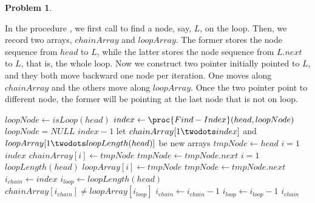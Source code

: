 \documentclass[12pt,a4paper]{report}
\newcommand{\get}{\leftarrow}
\theoremstyle{definition}
\newtheorem{problem}{\textbf{Problem}}
\theoremstyle{definition}
\begin{document}
\begin{problem}
\begin{enumerate}[label=\arabic*.]
\begin{enumerate}[label=\alph*.]
\begin{framed}
In the procedure , we first call  to find a node, say, $L$, on the loop. Then, we record two arrays, $chainArray$ and $loopArray$. The former stores the node sequence from $head$ to $L$, while the latter stores the node sequence from $L.next$ to $L$, that is, the whole loop. Now we construct two pointer initially pointed to $L$, and they both move backward one node per iteration. One moves along $chainArray$ and the others move along $loopArray$. Once the two pointer point to different node, the former will be pointing at the last node that is not on loop.

\begin{codebox}
\li $loopNode\get isLoop(head)$
\li $index\get \proc{Find-Index}(head, loopNode)$
\li \If $loopNode=NULL$ \Then
\li     \Return $index-1$
    \End
\li let $chainArray[1\twodots index]$ and $loopArray[1\twodots loopLength(head)]$ be new arrays
\li $tmpNode\get head$
\li \For $i=1$ \To $index$ \Do
\li     $chainArray[i]\get tmpNode$
\li     $tmpNode\get tmpNode.next$
    \End
\li \For $i=1$ \To $loopLength(head)$ \Do
\li     $loopArray[i]\get tmpNode$
\li     $tmpNode\get tmpNode.next$
    \End
\li $i_{chain}\get index$
\li $i_{loop}\get loopLength(head)$
\li \While $chainArray[i_{chain}]\neq loopArray[i_{loop}]$\Do
\li     $i_{chain}\get i_{chain}-1$
\li     $i_{loop}\get i_{loop}-1$
    \End
\li \Return $i_{chain}$
\end{codebox}
\end{framed}
    \end{enumerate}

\end{enumerate}
\end{problem}

\newpage
\end{document}
